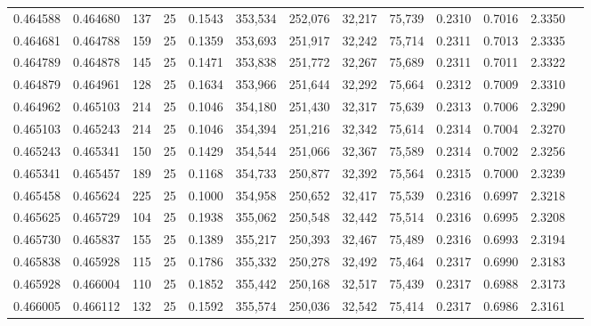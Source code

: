 \begin{tabular}{rrrrrrrrrrrrr}
0.464588 & 0.464680 &   137 &  25 &                                     0.1543 & 353,534 & 252,076 &  32,217 &  75,739 & 0.2310 & 0.7016 & 2.3350 \\
0.464681 & 0.464788 &   159 &  25 &                                     0.1359 & 353,693 & 251,917 &  32,242 &  75,714 & 0.2311 & 0.7013 & 2.3335 \\
0.464789 & 0.464878 &   145 &  25 &                                     0.1471 & 353,838 & 251,772 &  32,267 &  75,689 & 0.2311 & 0.7011 & 2.3322 \\
0.464879 & 0.464961 &   128 &  25 &                                     0.1634 & 353,966 & 251,644 &  32,292 &  75,664 & 0.2312 & 0.7009 & 2.3310 \\
0.464962 & 0.465103 &   214 &  25 &                                     0.1046 & 354,180 & 251,430 &  32,317 &  75,639 & 0.2313 & 0.7006 & 2.3290 \\
0.465103 & 0.465243 &   214 &  25 &                                     0.1046 & 354,394 & 251,216 &  32,342 &  75,614 & 0.2314 & 0.7004 & 2.3270 \\
0.465243 & 0.465341 &   150 &  25 &                                     0.1429 & 354,544 & 251,066 &  32,367 &  75,589 & 0.2314 & 0.7002 & 2.3256 \\
0.465341 & 0.465457 &   189 &  25 &                                     0.1168 & 354,733 & 250,877 &  32,392 &  75,564 & 0.2315 & 0.7000 & 2.3239 \\
0.465458 & 0.465624 &   225 &  25 &                                     0.1000 & 354,958 & 250,652 &  32,417 &  75,539 & 0.2316 & 0.6997 & 2.3218 \\
0.465625 & 0.465729 &   104 &  25 &                                     0.1938 & 355,062 & 250,548 &  32,442 &  75,514 & 0.2316 & 0.6995 & 2.3208 \\
0.465730 & 0.465837 &   155 &  25 &                                     0.1389 & 355,217 & 250,393 &  32,467 &  75,489 & 0.2316 & 0.6993 & 2.3194 \\
0.465838 & 0.465928 &   115 &  25 &                                     0.1786 & 355,332 & 250,278 &  32,492 &  75,464 & 0.2317 & 0.6990 & 2.3183 \\
0.465928 & 0.466004 &   110 &  25 &                                     0.1852 & 355,442 & 250,168 &  32,517 &  75,439 & 0.2317 & 0.6988 & 2.3173 \\
0.466005 & 0.466112 &   132 &  25 &                                     0.1592 & 355,574 & 250,036 &  32,542 &  75,414 & 0.2317 & 0.6986 & 2.3161 \\

\end{tabular}
